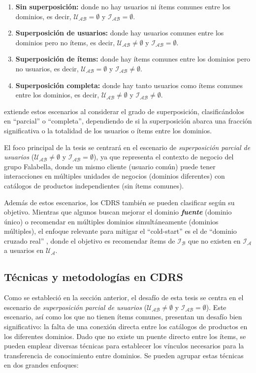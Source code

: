 		\begin{enumerate}
			\item \textbf{Sin superposición:} donde no hay usuarios ni ítems comunes entre los dominios, es decir, $\mathcal{U_{AB}} = \emptyset$ y $\mathcal{I_{AB}} = \emptyset$.
			\item \textbf{Superposición de usuarios:} donde hay usuarios comunes entre los dominios pero no ítems, es decir, $\mathcal{U_{AB}} \neq \emptyset$ y $\mathcal{I_{AB}} = \emptyset$.
			\item \textbf{Superposición de ítems:} donde hay ítems comunes entre los dominios pero no usuarios, es decir, $\mathcal{U_{AB}} = \emptyset$ y $\mathcal{I_{AB}} \neq \emptyset$.
			\item \textbf{Superposición completa:} donde hay tanto usuarios como ítems comunes entre los dominios, es decir, $\mathcal{U_{AB}} \neq \emptyset$ y $\mathcal{I_{AB}} \neq \emptyset$.
		\end{enumerate}

		\cite{10.1145/3548455} extiende estos escenarios al considerar el grado de superposición, clasificándolos en \enquote{parcial} o \enquote{completa}, dependiendo de si la superposición abarca una fracción significativa o la totalidad de los usuarios o ítems entre los dominios.

		El foco principal de la tesis se centrará en el escenario de \textit{superposición parcial de usuarios} ($\mathcal{U_{AB}} \neq \emptyset$ y $\mathcal{I_{AB}} = \emptyset$), ya que representa el contexto de negocio del grupo Falabella, donde un mismo cliente (usuario común) puede tener interacciones en múltiples unidades de negocios (dominios diferentes) con catálogos de productos independientes (sin ítems comunes).

		Además de estos escenarios, los CDRS también se pueden clasificar según su objetivo. Mientras que algunos buscan mejorar el dominio \textbf{\textit{fuente}} (dominio único) o recomendar en múltiples dominios simultáneamente (dominios múltiples), el enfoque relevante para mitigar el \enquote{cold-start} es el de \enquote{dominio cruzado real} \cite{6137420}, donde el objetivo es recomendar ítems de $\mathcal{I_{B}}$ que no existen en $\mathcal{I_{A}}$ a usuarios en $\mathcal{U_{A}}$.

	\subsection{Técnicas y metodologías en CDRS}
		Como se estableció en la sección anterior, el desafío de esta tesis se centra en el escenario de \textit{superposición parcial de usuarios} ($\mathcal{U_{AB}} \neq \emptyset$ y $\mathcal{I_{AB}} = \emptyset$). Este escenario, así como los que no tienen ítems comunes, presentan un desafío bien significativo: la falta de una conexión directa entre los catálogos de productos en los diferentes dominios. Dado que no existe un puente directo entre los ítems, se pueden emplear diversas técnicas para establecer los vínculos necesarios para la transferencia de conocimiento entre dominios. Se pueden agrupar estas técnicas en dos grandes enfoques:

